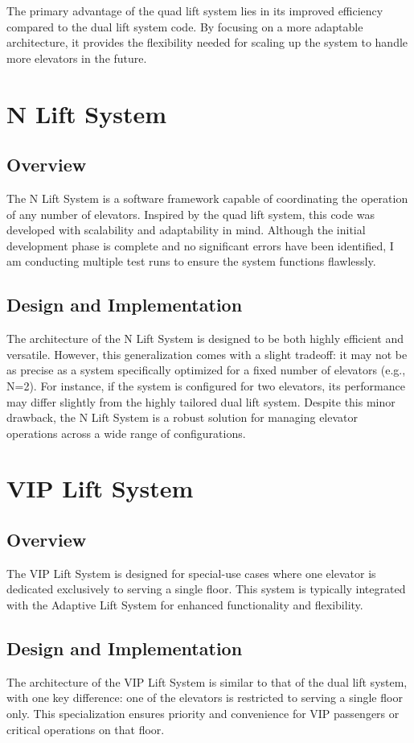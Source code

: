 \documentclass[12pt,a4paper]{report}
\begin{document}
The primary advantage of the quad lift system lies in its improved efficiency compared to the dual lift system code. By focusing on a more adaptable architecture, it provides the flexibility needed for scaling up the system to handle more elevators in the future.

\chapter{N Lift System}
\section{Overview}
The N Lift System is a software framework capable of coordinating the operation of any number of elevators. Inspired by the quad lift system, this code was developed with scalability and adaptability in mind. Although the initial development phase is complete and no significant errors have been identified, I am conducting multiple test runs to ensure the system functions flawlessly.

\section{Design and Implementation}
The architecture of the N Lift System is designed to be both highly efficient and versatile. However, this generalization comes with a slight tradeoff: it may not be as precise as a system specifically optimized for a fixed number of elevators (e.g., N=2). For instance, if the system is configured for two elevators, its performance may differ slightly from the highly tailored dual lift system. Despite this minor drawback, the N Lift System is a robust solution for managing elevator operations across a wide range of configurations.

\chapter{VIP Lift System}
\section{Overview}
The VIP Lift System is designed for special-use cases where one elevator is dedicated exclusively to serving a single floor. This system is typically integrated with the Adaptive Lift System for enhanced functionality and flexibility.

\section{Design and Implementation}
The architecture of the VIP Lift System is similar to that of the dual lift system, with one key difference: one of the elevators is restricted to serving a single floor only. This specialization ensures priority and convenience for VIP passengers or critical operations on that floor.
\end{document}
